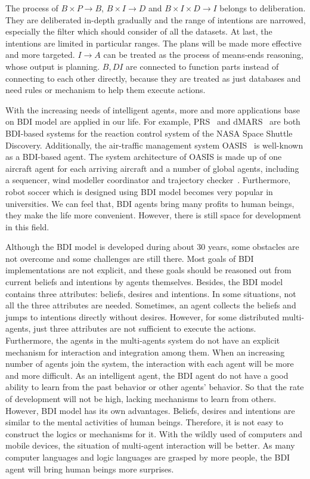The process of $B \times P \to B$, $B \times I \to D$ and $B \times I \times D \to I$ belongs to deliberation.
They are deliberated in-depth gradually and the range of intentions are narrowed, especially the filter which should consider of all the datasets.
At last, the intentions are limited in particular ranges.
The plans will be made more effective and more targeted.
$I \to A $ can be treated as the process of means-ends reasoning, whose output is planning.
$B,D I$ are connected to function parts instead of connecting to each other directly, because they are treated as just databases and need rules or mechanism to help them execute actions.

With the increasing needs of intelligent agents, more and more applications base on BDI model are applied in our life.
For example, PRS~\cite{Ingrand_PRS_1992} and dMARS~\cite{Mark_dMARS_2004} are both BDI-based systems for the reaction control system of the NASA Space Shuttle Discovery.
Additionally, the air-traffic management system OASIS~\cite{Magnus_OASIS_1992} is well-known as a BDI-based agent.
The system architecture of OASIS is made up of one aircraft agent for each arriving aircraft and a number of global agents, including a sequencer, wind modeller coordinator and trajectory checker~\cite{Rao_BDITheory_1995}.
Furthermore, robot soccer which is designed using BDI model becomes very popular in universities.
We can feel that, BDI agents bring many profits to human beings, they make the life more convenient.
However, there is still space for development in this field.

Although the BDI model is developed during about 30 years, some obstacles are not overcome and some challenges are still there.
Most goals of BDI implementations are not explicit, and these goals should be reasoned out from current beliefs and intentions by agents themselves.
Besides, the BDI model contains three attributes: beliefs, desires and intentions.
In some situations, not all the three attributes are needed.
Sometimes, an agent collects the beliefs and jumps to intentions directly without desires.
However, for some distributed multi-agents, just three attributes are not sufficient to execute the actions.
Furthermore, the agents in the multi-agents system do not have an explicit mechanism for interaction and integration among them.
When an increasing number of agents join the system, the interaction with each agent will be more and more difficult.
As an intelligent agent, the BDI agent do not have a good ability to learn from the past behavior or other agents’ behavior.
So that the rate of development will not be high, lacking mechanisms to learn from others.
However, BDI model has its own advantages.
Beliefs, desires and intentions are similar to the mental activities of human beings.
Therefore, it is not easy to construct the logics or mechanisms for it.
With the wildly used of computers and mobile devices, the situation of multi-agent interaction will be better.
As many computer languages and logic languages are grasped by more people, the BDI agent will bring human beings more surprises.

